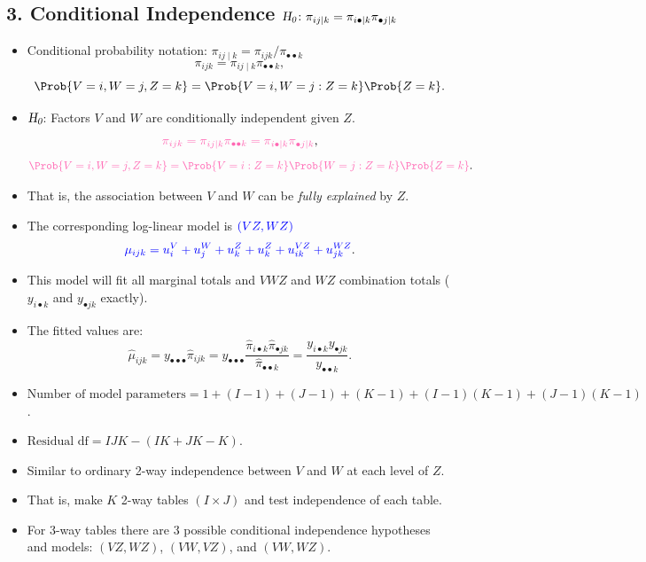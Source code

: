 \documentclass{article}\usepackage[]{graphicx}\usepackage[svgnames]{xcolor}
\providecommand\given{} %
\renewcommand\given{\nonscript\:\delimsize\vert\nonscript\:\mathopen{}}%
\renewcommand\given{\nonscript\:\delimsize\vert\nonscript\:\mathopen{}}%
\renewcommand\given{\nonscript\:\delimsize\vert\nonscript\:\mathopen{}}%
\renewcommand\given{\nonscript\:\delimsize\vert\nonscript\:\mathopen{}}%
\renewcommand\given{\nonscript\:\delimsize\vert\nonscript\:\mathopen{}}%
\renewcommand\given{\nonscript\:\delimsize\vert\nonscript\:\mathopen{}}%
\renewcommand\given{\nonscript\:\delimsize\vert\nonscript\:\mathopen{}}%
\renewcommand\given{\nonscript\:\delimsize\vert\nonscript\:\mathopen{}}%
\let\log\relax%
\newcommand{\HN}{\textsl{H}_{\textsl{0}}}%
\renewcommand\given{:}
\begin{document}
\subsection*{3. Conditional Independence $ \HN\colon \pi_{ij\mid k}=\pi_{i\bullet\mid k}\pi_{\bullet j\mid k} $}
\begin{itemize}
      \item Conditional probability notation: $ \pi_{ij\mid k}=\pi_{ijk}/\pi_{\bullet\bullet k} $
            \[ \pi_{ijk}=\pi_{ij\mid k}\pi_{\bullet\bullet k}, \]
            \[ \Prob{V=i,W=j,Z=k}=\Prob{V=i,W=j\given Z=k}\Prob{Z=k}. \]
      \item $ \HN $: Factors $ V $ and $ W $ are conditionally independent given $ Z $.
            \[ \textcolor{HotPink}{
                        \pi_{ijk}=\pi_{ij\mid k}\pi_{\bullet\bullet k}=\pi_{i\bullet\mid k}\pi_{\bullet j\mid k}
                  }, \]
            \[ \textcolor{HotPink}{
                        \Prob{V=i,W=j,Z=k}=\Prob{V=i\given Z=k}\Prob{W=j\given Z=k}\Prob{Z=k}
                  }. \]
      \item That is, the association between $ V $ and $ W $ can be \emph{fully explained} by $ Z $.
      \item The corresponding log-linear model is $ \textcolor{Blue}{(VZ,WZ)} $
            \[ \textcolor{Blue}{\log{\mu}_{ijk}=u_i^V+u_j^W+u_k^Z+u_k^Z+u_{ik}^{VZ}+u_{jk}^{WZ}}. \]
      \item This model will fit all marginal totals and $ VWZ $ and $ WZ $ combination totals ($ y_{i\bullet k} $
            and $ y_{\bullet jk} $ exactly).
      \item The fitted values are:
            \[ \hat{\mu}_{ijk}=y_{\bullet\bullet\bullet}\hat{\pi}_{ijk}=y_{\bullet\bullet\bullet}\frac{\hat{\pi}_{i\bullet k}\hat{\pi}_{\bullet jk}}{\hat{\pi}_{\bullet\bullet k}}=\frac{y_{i\bullet k}y_{\bullet jk}}{y_{\bullet\bullet k}}. \]
      \item $ \text{Number of model parameters}=1 + (I - 1) + (J - 1) + (K - 1) + (I - 1)(K - 1) + (J - 1)(K - 1) $.
      \item $ \text{Residual df}=IJK - (IK + JK - K) $.
      \item Similar to ordinary 2-way independence between $V$ and $W$ at each level of $Z$.
      \item That is, make $K$ 2-way tables $ (I\times J) $ and test independence of each table.
      \item For 3-way tables there are 3 possible conditional independence hypotheses and
            models: $(VZ,WZ)$, $(VW,VZ)$, and $(VW,WZ)$.
\end{itemize}
\end{document}
